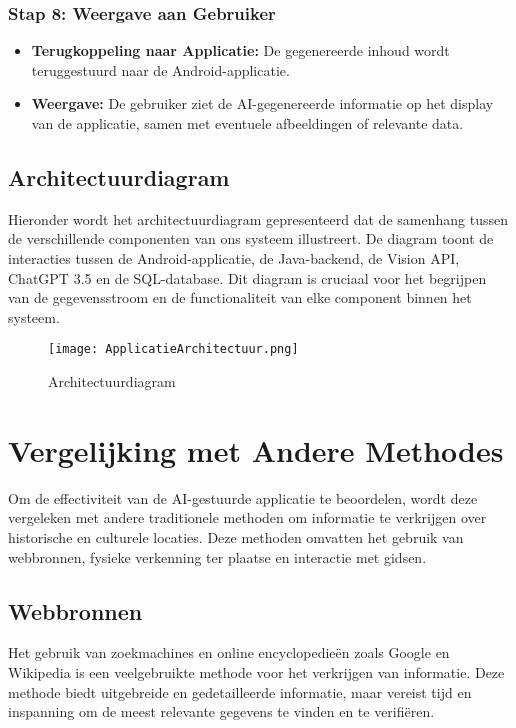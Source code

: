 \subsubsection{Stap 8: Weergave aan Gebruiker}
\begin{itemize}
    \item \textbf{Terugkoppeling naar Applicatie:} De gegenereerde inhoud wordt teruggestuurd naar de Android-applicatie.
    \item \textbf{Weergave:} De gebruiker ziet de AI-gegenereerde informatie op het display van de applicatie, samen met eventuele afbeeldingen of relevante data.
\end{itemize}

\pagebreak

\subsection{Architectuurdiagram}

Hieronder wordt het architectuurdiagram gepresenteerd dat de samenhang tussen de verschillende componenten van ons systeem illustreert. De diagram toont de interacties tussen de Android-applicatie, de Java-backend, de Vision API, ChatGPT 3.5 en de SQL-database. Dit diagram is cruciaal voor het begrijpen van de gegevensstroom en de functionaliteit van elke component binnen het systeem.


\begin{figure}[ht]
    \centering
    \texttt{[image: ApplicatieArchitectuur.png]}
    \caption{Architectuurdiagram}
    \label{fig:example}
\end{figure}

\section{Vergelijking met Andere Methodes}
Om de effectiviteit van de AI-gestuurde applicatie te beoordelen, wordt deze vergeleken met andere traditionele methoden om informatie te verkrijgen over historische en culturele locaties. Deze methoden omvatten het gebruik van webbronnen, fysieke verkenning ter plaatse en interactie met gidsen.

\subsection{Webbronnen}
Het gebruik van zoekmachines en online encyclopedieën zoals Google en Wikipedia is een veelgebruikte methode voor het verkrijgen van informatie. Deze methode biedt uitgebreide en gedetailleerde informatie, maar vereist tijd en inspanning om de meest relevante gegevens te vinden en te verifiëren.

